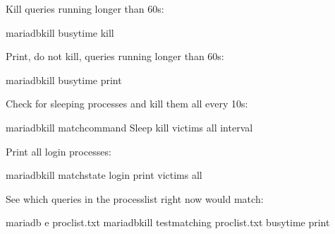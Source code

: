 \documentclass[letterpaper,10pt,english]{sphinxmanual}
\begin{document}
Kill queries running longer than 60s:

\begin{sphinxVerbatim}[commandchars=\\\{\}]
mariadb\PYGZhy{}kill \PYGZhy{}\PYGZhy{}busy\PYGZhy{}time  \PYGZhy{}\PYGZhy{}kill
\end{sphinxVerbatim}

Print, do not kill, queries running longer than 60s:

\begin{sphinxVerbatim}[commandchars=\\\{\}]
mariadb\PYGZhy{}kill \PYGZhy{}\PYGZhy{}busy\PYGZhy{}time  \PYGZhy{}\PYGZhy{}print
\end{sphinxVerbatim}

Check for sleeping processes and kill them all every 10s:

\begin{sphinxVerbatim}[commandchars=\\\{\}]
mariadb\PYGZhy{}kill \PYGZhy{}\PYGZhy{}match\PYGZhy{}command Sleep \PYGZhy{}\PYGZhy{}kill \PYGZhy{}\PYGZhy{}victims all \PYGZhy{}\PYGZhy{}interval 
\end{sphinxVerbatim}

Print all login processes:

\begin{sphinxVerbatim}[commandchars=\\\{\}]
mariadb\PYGZhy{}kill \PYGZhy{}\PYGZhy{}match\PYGZhy{}state login \PYGZhy{}\PYGZhy{}print \PYGZhy{}\PYGZhy{}victims all
\end{sphinxVerbatim}

See which queries in the processlist right now would match:

\begin{sphinxVerbatim}[commandchars=\\\{\}]
mariadb \PYGZhy{}e  \PYGZgt{} proclist.txt
mariadb\PYGZhy{}kill \PYGZhy{}\PYGZhy{}test\PYGZhy{}matching proclist.txt \PYGZhy{}\PYGZhy{}busy\PYGZhy{}time  \PYGZhy{}\PYGZhy{}print
\end{sphinxVerbatim}
\end{document}
